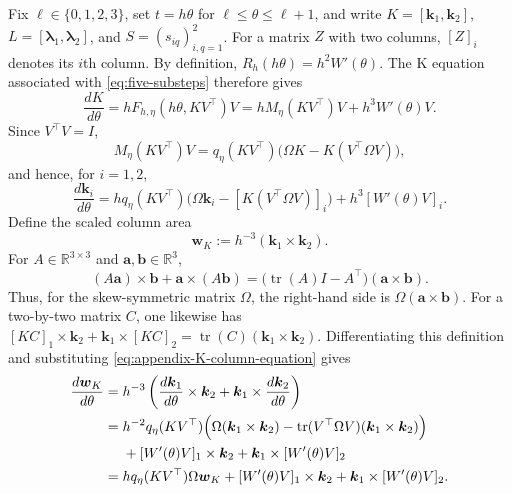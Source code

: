 \documentclass[10pt,a4paper]{amsart}
\numberwithin{equation}{section}
\begin{document}
Fix $\ell\in\{0,1,2,3\}$, set $t=h\theta$ for
$\ell\le\theta\le\ell+1$, and write
$K=[\boldsymbol k_1,\boldsymbol k_2]$,
$L=[\boldsymbol\lambda_1,\boldsymbol\lambda_2]$, and
$S=(s_{iq})_{i,q=1}^2$.  For a matrix $Z$ with two columns,
$[Z]_i$ denotes its $i$th column.  By definition,
$R_h(h\theta)=h^2W'(\theta)$.
The K equation associated with \eqref{eq:five-substeps} therefore gives
\begin{equation}\label{eq:appendix-K-equation}
 \frac{dK}{d\theta}
 =hF_{h,\eta}(h\theta,KV^\top)V
 =hM_\eta(KV^\top)V+h^3W'(\theta)V.
\end{equation}
Since $V^\top V=I$,
\begin{equation}\label{eq:appendix-K-columns}
 M_\eta(KV^\top)V
 =q_\eta(KV^\top)\bigl(\Omega K-K(V^\top\Omega V)\bigr),
\end{equation}
and hence, for $i=1,2$,
\begin{equation}\label{eq:appendix-K-column-equation}
 \frac{d\boldsymbol k_i}{d\theta}
 =hq_\eta(KV^\top)
  \bigl(\Omega\boldsymbol k_i-[K(V^\top\Omega V)]_i\bigr)
  +h^3[W'(\theta)V]_i.
\end{equation}
Define the scaled column area
\begin{equation}\label{eq:appendix-K-area-definition}
 \boldsymbol w_K:=h^{-3}(\boldsymbol k_1\times\boldsymbol k_2).
\end{equation}
For $A\in\mathbb R^{3\times3}$ and
$\boldsymbol a,\boldsymbol b\in\mathbb R^3$,
\begin{equation}\label{eq:cross-product-linear-identity}
 (A\boldsymbol a)\times\boldsymbol b
 +\boldsymbol a\times(A\boldsymbol b)
 =\bigl(\operatorname{tr}(A)I-A^\top\bigr)
  (\boldsymbol a\times\boldsymbol b).
\end{equation}
Thus, for the skew-symmetric matrix $\Omega$, the right-hand side is
$\Omega(\boldsymbol a\times\boldsymbol b)$.  For a two-by-two matrix
$C$, one likewise has
$[KC]_1\times\boldsymbol k_2+\boldsymbol k_1\times[KC]_2
=\operatorname{tr}(C)(\boldsymbol k_1\times\boldsymbol k_2)$.
Differentiating this definition and substituting
\eqref{eq:appendix-K-column-equation} gives
\begin{equation}\label{eq:appendix-normalized-K}
\begin{aligned}
 \frac{d\boldsymbol w_K}{d\theta}
={}&h^{-3}\left(
 \frac{d\boldsymbol k_1}{d\theta}\times\boldsymbol k_2
 +\boldsymbol k_1\times\frac{d\boldsymbol k_2}{d\theta}
 \right)\\
={}&h^{-2}q_\eta(KV^\top)\Bigl(
 \Omega(\boldsymbol k_1\times\boldsymbol k_2)
 -\operatorname{tr}(V^\top\Omega V)
  (\boldsymbol k_1\times\boldsymbol k_2)\Bigr)\\
 &+[W'(\theta)V]_1\times\boldsymbol k_2
 +\boldsymbol k_1\times[W'(\theta)V]_2\\
={}&hq_\eta(KV^\top)\Omega\boldsymbol w_K
 +[W'(\theta)V]_1\times\boldsymbol k_2
 +\boldsymbol k_1\times[W'(\theta)V]_2.
\end{aligned}
\end{equation}
\end{document}
